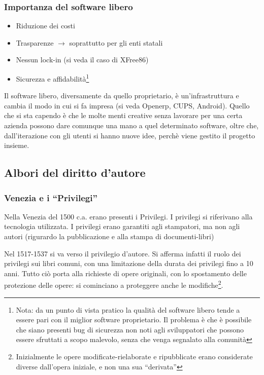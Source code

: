 \subsubsection{Importanza del software libero}

\begin{itemize}

\item Riduzione dei costi

\item Trasparenze $\to$ soprattutto per gli enti statali

\item Nessun lock-in (si veda il caso di XFree86)

\item Sicurezza e affidabilit\`a\footnote{Nota: da un punto di vista pratico la qualit\`a del software libero tende a essere pari con il miglior software proprietario. Il problema \`e che \`e possibile che siano presenti bug di sicurezza non noti agli sviluppatori che possono essere sfruttati a scopo malevolo, senza che venga segnalato alla comunit\`a}

\end{itemize}

Il software libero, diversamente da quello proprietario, \`e un'infrastruttura e cambia il modo in cui si fa impresa (si veda Openerp, CUPS, Android). Quello che si sta capendo \`e che le molte menti creative senza lavorare per una certa azienda possono dare comunque una mano a quel determinato software, oltre che, dall'iterazione con gli utenti si hanno nuove idee, perch\`e viene gestito il progetto insieme.

\subsection{Albori del diritto d'autore}

\subsubsection{Venezia e i ``Privilegi''}

Nella Venezia del 1500 c.a. erano presenti i Privilegi. I privilegi si riferivano alla tecnologia utilizzata. I privilegi erano garantiti agli stampatori, ma non agli autori (rigurardo la pubblicazione e alla stampa di documenti-libri)

Nel 1517-1537 si va verso il privilegio d'autore. Si afferma infatti il ruolo dei privilegi sui libri comuni, con una limitazione della durata dei privilegi fino a 10 anni. Tutto ci\`o porta alla richieste di opere originali, con lo spostamento delle protezione delle opere: si cominciano a proteggere anche le modifiche\footnote{Inizialmente le opere modificate-rielaborate e ripubblicate erano considerate diverse dall'opera iniziale, e non una sua ``derivata''}.

